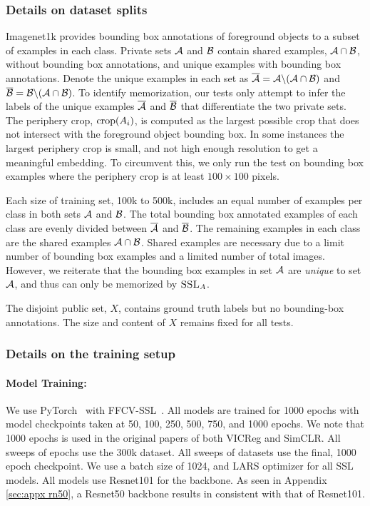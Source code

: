\subsubsection{Details on dataset splits}
\label{sec:appx splits}
Imagenet1k provides bounding box annotations of foreground objects to a subset of examples in each class. 
Private sets $\mathcal{A}$ and $\mathcal{B}$ contain shared examples, $\mathcal{A} \cap \mathcal{B}$, without bounding box annotations, and unique examples with bounding box annotations. Denote the unique examples in each set as $\overline{\mathcal{A}} = \mathcal{A} \backslash (\mathcal{A} \cap \mathcal{B})$ and $\overline{\mathcal{B}} = \mathcal{B} \backslash (\mathcal{A} \cap \mathcal{B})$. To identify memorization, our tests only attempt to infer the labels of the unique examples $\overline{\mathcal{A}}$ and $\overline{\mathcal{B}}$ that differentiate the two private sets. The periphery crop, $\mathrm{crop}({A_i})$, is computed as the largest possible crop that does not intersect with the foreground object bounding box. In some instances the largest periphery crop is small, and not high enough resolution to get a meaningful embedding. To circumvent this, we only run the test on bounding box examples where the periphery crop is at least $100 \times 100$ pixels.

Each size of training set, 100k to 500k, includes an equal number of examples per class in both sets $\mathcal{A}$ and $\mathcal{B}$. The total bounding box annotated examples of each class are evenly divided between $\overline{\mathcal{A}}$ and $\overline{\mathcal{B}}$. The remaining examples in each class are the shared examples $\mathcal{A} \cap \mathcal{B}$. Shared examples are necessary due to a limit number of bounding box examples and a limited number of total images. However, we reiterate that the bounding box examples in set $\mathcal{A}$ are \emph{unique} to set $\mathcal{A}$, and thus can only be memorized by $\textsc{SSL}_A$. 

The disjoint public set, $X$, contains ground truth labels but no bounding-box annotations. The size and content of $X$ remains fixed for all tests. 

\subsubsection{Details on the training setup}
\paragraph{Model Training:} We use PyTorch~\citep{pytorch} with FFCV-SSL~\citep{demo}. All models are trained for 1000 epochs with model checkpoints taken at 50, 100, 250, 500, 750, and 1000 epochs. We note that 1000 epochs is used in the original papers of both VICReg and SimCLR. All sweeps of epochs use the 300k dataset. All sweeps of datasets use the final, 1000 epoch checkpoint. We use a batch size of 1024, and LARS optimizer \citep{LARS} for all SSL models. All models use Resnet101 for the backbone. As seen in Appendix \ref{sec:appx rn50}, a Resnet50 backbone results in \dejavu consistent with that of Resnet101. 

